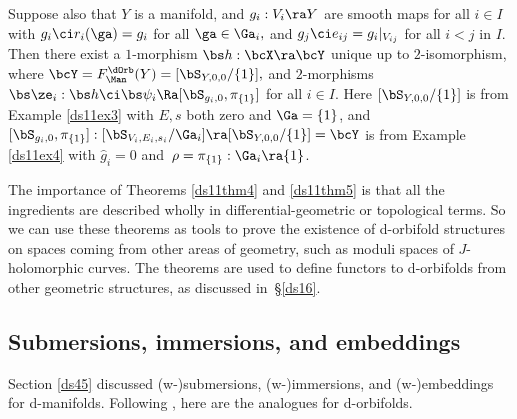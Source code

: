 \documentclass{article}
\begin{document}
\begin{thm}
Suppose also that\/ $Y$ is a manifold, and\/ $g_i:V_i\ra Y$ are
smooth maps for all\/ $i\in I$ with\/ $g_i\ci r_i(\ga)= g_i$ for
all\/ $\ga\in\Ga_i,$ and\/ $g_j\ci e_{ij}=g_i\vert_{V_{ij}}$ for
all\/ $i<j$ in $I$. Then there exist a $1$-morphism $\bs
h:\bcX\ra\bcY$ unique up to $2$-isomorphism, where
$\bcY=F_\Man^\dOrb(Y)=[\bS_{Y,0,0}/\{1\}],$ and\/ $2$-morphisms
$\bs\ze_i:\bs h\ci\bs\psi_i\Ra[\bS_{g_i,0},\pi_{\{1\}}]$ for all\/
$i\in I$. Here $[\bS_{Y,0,0}/\{1\}]$ is from Example\/
{\rm\ref{ds11ex3}} with\/ $E,s$ both zero and\/ $\Ga=\{1\}$, and\/
$[\bS_{g_i,0},\pi_{\{1\}}]:[\bS_{V_i,E_i,s_i}/\Ga_i]\ra
[\bS_{Y,0,0}/\{1\}]=\bcY$ is from Example\/ {\rm\ref{ds11ex4}}
with\/ $\hat g_i=0$
and\/~$\rho=\pi_{\{1\}}:\Ga_i\ra\{1\}$.
\label{ds11thm5}
\end{thm}

The importance of Theorems \ref{ds11thm4} and \ref{ds11thm5} is that
all the ingredients are described wholly in differential-geometric
or topological terms. So we can use these theorems as tools to prove
the existence of d-orbifold structures on spaces coming from other
areas of geometry, such as moduli spaces of $J$-holomorphic
curves. The theorems are used to define functors to d-orbifolds from
other geometric structures, as discussed
in~\S\ref{ds16}.

\subsection{Submersions, immersions, and embeddings}
\label{ds114}

Section \ref{ds45} discussed (w-)submersions, (w-)immersions, and
(w-)embeddings for d-manifolds. Following \cite[\S 10.3]{Joyc6},
here are the analogues for d-orbifolds.
\end{document}
